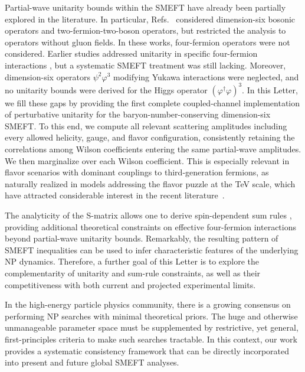 \documentclass[
aps,
prd,
10pt,
twocolumn,
oneside,
preprintnumbers,
superscriptaddress,
amsmath,
amssymb,
nofootinbib,
flushbottom]{revtex4-2}
\begin{document}
Partial-wave unitarity bounds within the SMEFT have already been partially explored in the literature.
In particular, Refs.~\cite{Corbett:2014ora,Corbett:2017qgl,Cao:2023qks} considered dimension-six bosonic operators and two-fermion-two-boson operators, but restricted the analysis to operators without gluon fields.
In these works, four-fermion operators were not considered.
Earlier studies addressed unitarity in specific four-fermion interactions \cite{Anders:1993dk}, but a systematic SMEFT treatment was still lacking.
Moreover, dimension-six operators $\psi^2\varphi^3$ modifying Yukawa interactions were neglected, and no unitarity bounds were derived for the Higgs operator $(\varphi^\dagger \varphi)^3$.
In this Letter, we fill these gaps by providing the first complete
coupled-channel implementation of perturbative unitarity for the
baryon-number-conserving dimension-six SMEFT. To this end, we compute
all relevant scattering amplitudes including every allowed helicity,
gauge, and flavor configuration, consistently retaining the correlations
among Wilson coefficients entering the same partial-wave amplitudes.
We then marginalize over each Wilson coefficient. 
This is especially relevant in flavor scenarios with dominant couplings to third-generation fermions, as naturally realized in models addressing the flavor puzzle at the TeV scale, which have attracted considerable interest in the recent literature~\cite{Bordone:2017bld,Greljo:2018tuh,Allwicher:2020esa,Fuentes-Martin:2020bnh,Fuentes-Martin:2022xnb,Barbieri:2023qpf,Barbieri:2024zkh,Davighi:2023evx,Davighi:2023iks,Fuentes-Martin:2024fpx,Covone:2024elw,Lizana:2024jby,FernandezNavarro:2023rhv,FernandezNavarro:2024hnv,FernandezNavarro:2025zmb,Isidori:2025rci,Greljo:2025mwj}.

The analyticity of the S-matrix allows one to derive spin-dependent sum rules \cite{Low:2009di,Altmannshofer:2023bfk,Altmannshofer:2025lun,Gu:2020thj,Azatov:2021ygj,Remmen:2020uze,Remmen:2022orj}, providing additional theoretical constraints on effective four-fermion interactions beyond partial-wave unitarity bounds. Remarkably, the resulting pattern of SMEFT inequalities can 
be used to infer characteristic features of the underlying NP dynamics. Therefore, a further goal of this Letter is to explore the complementarity of unitarity and sum-rule constraints, as well as their competitiveness with both current and projected experimental limits.

In the high-energy particle physics community, there is a growing consensus on performing NP searches with minimal theoretical priors. 
The huge and otherwise unmanageable parameter space must be supplemented by restrictive, yet general, first-principles criteria to make such searches tractable.
In this context, our work provides a systematic consistency framework that can be directly incorporated into present and future global SMEFT analyses.
\end{document}
